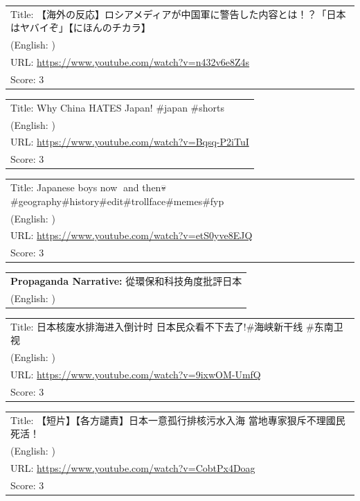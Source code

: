 \documentclass{article}
\begin{document}
\noindent
\begin{tabular}{p{}}
Title: 【海外の反応】ロシアメディアが中国軍に警告した内容とは！？「日本はヤバイぞ」【にほんのチカラ】 \\
(English: ) \\
URL: \url{https://www.youtube.com/watch?v=n432v6e8Z4s} \\
Score: 3 \\
\end{tabular}
\vspace{0.5em}

\noindent
\begin{tabular}{p{}}
Title: Why China HATES Japan! \#japan \#shorts \\
(English: ) \\
URL: \url{https://www.youtube.com/watch?v=Bqsq-P2iTuI} \\
Score: 3 \\
\end{tabular}
\vspace{0.5em}

\noindent
\begin{tabular}{p{}}
Title: Japanese boys now🤡 and then💀 \#geography\#history\#edit\#trollface\#memes\#fyp \\
(English: ) \\
URL: \url{https://www.youtube.com/watch?v=etS0yve8EJQ} \\
Score: 3 \\
\end{tabular}
\vspace{0.5em}

\vspace{1em}
\noindent
\begin{tabular}{p{}}
\textbf{Propaganda Narrative:} 從環保和科技角度批評日本 \\
(English: ) \\
\end{tabular}

\noindent
\begin{tabular}{p{}}
Title: 日本核废水排海进入倒计时 日本民众看不下去了!\#海峡新干线 \#东南卫视 \\
(English: ) \\
URL: \url{https://www.youtube.com/watch?v=9ixwOM-UmfQ} \\
Score: 3 \\
\end{tabular}
\vspace{0.5em}

\noindent
\begin{tabular}{p{}}
Title: 【短片】【各方譴責】日本一意孤行排核污水入海 當地專家狠斥不理國民死活！ \\
(English: ) \\
URL: \url{https://www.youtube.com/watch?v=CobtPx4Doag} \\
Score: 3 \\
\end{tabular}
\vspace{0.5em}
\end{document}
